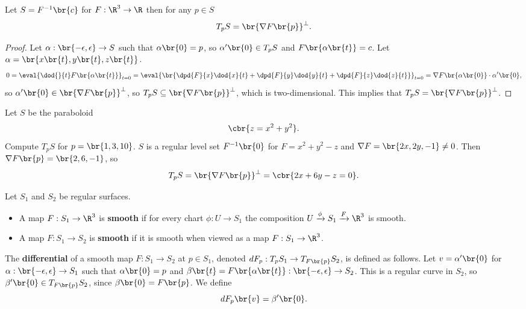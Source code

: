 
\begin{proposition}
Let $ S = F^{-1}\br{c} $ for $ F : \R^3 \to \R $ then for any $ p \in S $
$$ T_pS = \br{\nabla F\br{p}}^\perp. $$
\end{proposition}

\begin{proof}
Let $ \alpha : \br{-\epsilon, \epsilon} \to S $ such that $ \alpha\br{0} = p $, so $ \alpha'\br{0} \in T_pS $ and $ F\br{\alpha\br{t}} = c $. Let $ \alpha = \br{x\br{t}, y\br{t}, z\br{t}} $.
$$ 0 = \eval{\dod{}{t}F\br{\alpha\br{t}}}_{t = 0} = \eval{\br{\dpd{F}{x}\dod{x}{t} + \dpd{F}{y}\dod{y}{t} + \dpd{F}{z}\dod{z}{t}}}_{t = 0} = \nabla F\br{\alpha\br{0}} \cdot \alpha'\br{0}, $$
so $ \alpha'\br{0} \in \br{\nabla F\br{p}}^\perp $, so $ T_pS \subseteq \br{\nabla F\br{p}}^\perp $, which is two-dimensional. This implies that $ T_pS = \br{\nabla F\br{p}}^\perp $.
\end{proof}

\begin{example*}
Let $ S $ be the paraboloid
$$ \cbr{z = x^2 + y^2}. $$
Compute $ T_pS $ for $ p = \br{1, 3, 10} $. $ S $ is a regular level set $ F^{-1}\br{0} $ for $ F = x^2 + y^2 - z $ and $ \nabla F = \br{2x, 2y, -1} \ne 0 $. Then $ \nabla F\br{p} = \br{2, 6, -1} $, so
$$ T_pS = \br{\nabla F\br{p}}^\perp = \cbr{2x + 6y - z = 0}. $$
\end{example*}

\pagebreak

\begin{definition}
Let $ S_1 $ and $ S_2 $ be regular surfaces.
\begin{itemize}
\item A map $ F : S_1 \to \R^3 $ is \textbf{smooth} if for every chart $ \phi : U \to S_1 $ the composition $ U \xrightarrow{\phi} S_1 \xrightarrow{F} \R^3 $ is smooth.
\item A map $ F : S_1 \to S_2 $ is \textbf{smooth} if it is smooth when viewed as a map $ F : S_1 \to \R^3 $.
\end{itemize}
The \textbf{differential} of a smooth map $ F : S_1 \to S_2 $ at $ p \in S_1 $, denoted $ dF_p : T_pS_1 \to T_{F\br{p}}S_2 $, is defined as follows. Let $ v = \alpha'\br{0} $ for $ \alpha : \br{-\epsilon, \epsilon} \to S_1 $ such that $ \alpha\br{0} = p $ and $ \beta\br{t} = F\br{\alpha\br{t}} : \br{-\epsilon, \epsilon} \to S_2 $. This is a regular curve in $ S_2 $, so $ \beta'\br{0} \in T_{F\br{p}}S_2 $, since $ \beta\br{0} = F\br{p} $. We define
$$ dF_p\br{v} = \beta'\br{0}. $$
\end{definition}

